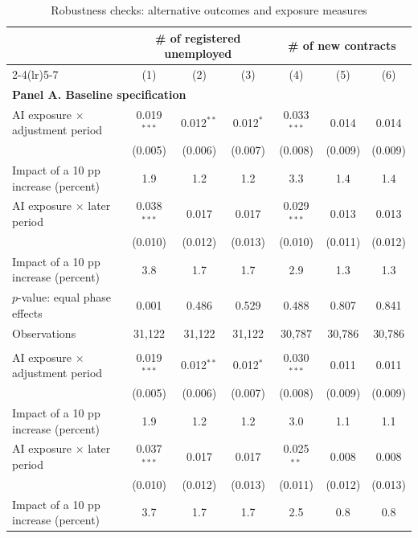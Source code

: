 \begin{landscape}
\begin{table}[H]
\centering
\caption{Robustness checks: alternative outcomes and exposure measures}
\label{tab:v1_robustness}
\begin{threeparttable}
\scriptsize
\renewcommand{\arraystretch}{0.76}
\setlength{\tabcolsep}{3.5pt}
\begin{tabular}{lcccccc}
\toprule
& \multicolumn{3}{c}{\# of registered unemployed} & \multicolumn{3}{c}{\# of new contracts} \\
\cmidrule(lr){2-4}\cmidrule(lr){5-7}
& (1) & (2) & (3) & (4) & (5) & (6) \\
\midrule
\multicolumn{7}{l}{\textbf{Panel A. Baseline specification}} \\
AI exposure $\times$ adjustment period & 0.019$^{***}$ & 0.012$^{**}$ & 0.012$^{*}$ & 0.033$^{***}$ & 0.014 & 0.014 \\
 & (0.005) & (0.006) & (0.007) & (0.008) & (0.009) & (0.009) \\
Impact of a 10 pp increase (percent) & 1.9 & 1.2 & 1.2 & 3.3 & 1.4 & 1.4 \\
\addlinespace
AI exposure $\times$ later period & 0.038$^{***}$ & 0.017 & 0.017 & 0.029$^{***}$ & 0.013 & 0.013 \\
 & (0.010) & (0.012) & (0.013) & (0.010) & (0.011) & (0.012) \\
Impact of a 10 pp increase (percent) & 3.8 & 1.7 & 1.7 & 2.9 & 1.3 & 1.3 \\
$p$-value: equal phase effects & 0.001 & 0.486 & 0.529 & 0.488 & 0.807 & 0.841 \\
Observations & 31,122 & 31,122 & 31,122 & 30,787 & 30,786 & 30,786 \\
\addlinespace
\multicolumn{7}{l}{\textbf{Panel B. Alternative outcomes: log(Y+1)}} \\
AI exposure $\times$ adjustment period & 0.019$^{***}$ & 0.012$^{**}$ & 0.012$^{*}$ & 0.030$^{***}$ & 0.011 & 0.011 \\
 & (0.005) & (0.006) & (0.007) & (0.008) & (0.009) & (0.009) \\
Impact of a 10 pp increase (percent) & 1.9 & 1.2 & 1.2 & 3.0 & 1.1 & 1.1 \\
\addlinespace
AI exposure $\times$ later period & 0.037$^{***}$ & 0.017 & 0.017 & 0.025$^{**}$ & 0.008 & 0.008 \\
 & (0.010) & (0.012) & (0.013) & (0.011) & (0.012) & (0.013) \\
Impact of a 10 pp increase (percent) & 3.7 & 1.7 & 1.7 & 2.5 & 0.8 & 0.8 \\

\end{tabular}
\end{threeparttable}
\end{table}
\end{landscape}
